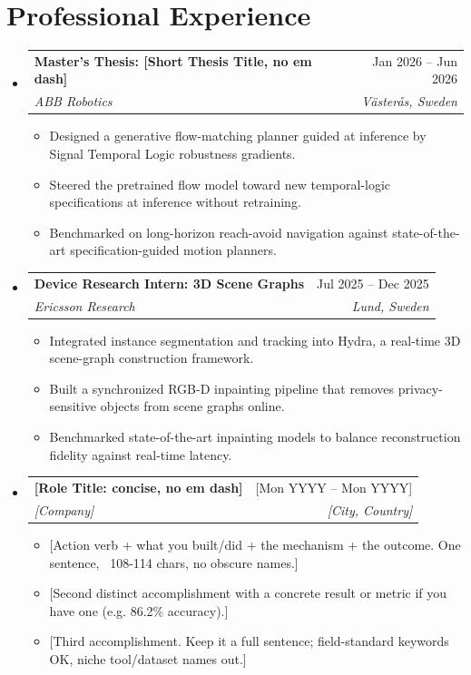 \documentclass[letterpaper, 11pt]{article}
\makeatletter
\newcommand{\vTableRowSep}{-2pt}   %
\newcommand{\vItemTop}{-2pt}       %
\newcommand{\vSubheadingEnd}{-10pt}%
\newcommand{\vListStart}{-0.3em}   %
\newcommand{\vListEnd}{-7.5pt}     %
\newcommand{\vListGroupEnd}{-1em}  %
\newcommand{\resumeItem}[1]{ \item\small{ {#1 \vspace{\vItemTop}} } }
\newcommand{\resumeSubheading}[4]{
\vspace{\vItemTop}
\item
\begin{tabular*}{1.0\textwidth}[t]{l@{\extracolsep{\fill}}r}
	\textbf{#1}       & {\small #2} \\
     [\vTableRowSep]
	\textit{{\small#3}} & \textit{\small #4} \\
\end{tabular*}
\vspace{\vSubheadingEnd}
}
\newcommand{\resumeSubHeadingListStart}{\begin{itemize}[leftmargin=0.0in, label={}]}
\newcommand{\resumeSubHeadingListEnd}{\end{itemize}\vspace{\vListGroupEnd}}
\newcommand{\resumeItemListStart}{\vspace{\vListStart}\begin{itemize}[leftmargin=0.25in]}
\newcommand{\resumeItemListEnd}{\end{itemize}\vspace{\vListEnd}}  %
\makeatother
\begin{document}
\section{\color{Blue}Professional Experience}
\resumeSubHeadingListStart

    \resumeSubheading{Master's Thesis: [Short Thesis Title, no em dash]}{Jan 2026 -- Jun 2026}{ABB Robotics}{V\"{a}ster\aa s, Sweden}
    \resumeItemListStart
        \resumeItem{Designed a generative flow-matching planner guided at inference by Signal Temporal Logic robustness gradients.}
        \resumeItem{Steered the pretrained flow model toward new temporal-logic specifications at inference without retraining.}
        \resumeItem{Benchmarked on long-horizon reach-avoid navigation against state-of-the-art specification-guided motion planners.}
    \resumeItemListEnd

    \resumeSubheading{Device Research Intern: 3D Scene Graphs}{Jul 2025 -- Dec 2025}{Ericsson Research}{Lund, Sweden}
    \resumeItemListStart
        \resumeItem{Integrated instance segmentation and tracking into Hydra, a real-time 3D scene-graph construction framework.}
        \resumeItem{Built a synchronized RGB-D inpainting pipeline that removes privacy-sensitive objects from scene graphs online.}
        \resumeItem{Benchmarked state-of-the-art inpainting models to balance reconstruction fidelity against real-time latency.}
    \resumeItemListEnd

    \resumeSubheading{[Role Title: concise, no em dash]}{[Mon YYYY -- Mon YYYY]}{[Company]}{[City, Country]}
    \resumeItemListStart
        \resumeItem{[Action verb + what you built/did + the mechanism + the outcome. One sentence, ~108-114 chars, no obscure names.]}
        \resumeItem{[Second distinct accomplishment with a concrete result or metric if you have one (e.g. 86.2\% accuracy).]}
        \resumeItem{[Third accomplishment. Keep it a full sentence; field-standard keywords OK, niche tool/dataset names out.]}
    \resumeItemListEnd

\resumeSubHeadingListEnd
\end{document}
